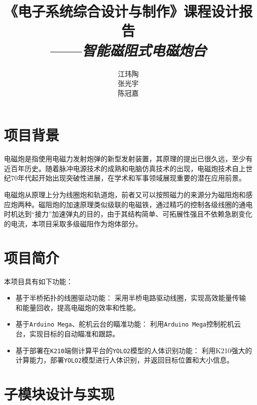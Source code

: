 \documentclass{article}
\title{《电子系统综合设计与制作》课程设计报告\\——\textit{智能磁阻式电磁炮台}}
\author{江玮陶\quad 2023010631\\张光宇\quad 2023010629\\陈冠嘉\quad 2023010503}
\begin{document}
\maketitle
\tableofcontents
\section{项目背景}
电磁炮是指使用电磁力发射炮弹的新型发射装置，其原理的提出已很久远，至少有近百年历史。随着脉冲电源技术的成熟和电脑仿真技术的出现，电磁炮技术自上世纪70年代起开始出现突破性进展，在学术和军事领域展现重要的潜在应用前景。

电磁炮从原理上分为线圈炮和轨道炮，前者又可以按照磁力的来源分为磁阻炮和感应炮两种。磁阻炮的加速原理类似级联的电磁铁，通过精巧的控制各级线圈的通电时机达到“接力”加速弹丸的目的，由于其结构简单、可拓展性强且不依赖急剧变化的电流，本项目采取多级磁阻作为炮体部分。
\section{项目简介}
本项目具有如下功能：
\begin{itemize}
    \item 基于半桥拓扑的线圈驱动功能： 采用半桥电路驱动线圈，实现高效能量传输和能量回收，提高电磁炮的效率和性能。
    \item 基于\texttt{Arduino Mega}、舵机云台的瞄准功能： 利用\texttt{Arduino Mega}控制舵机云台，实现目标的自动瞄准和跟踪。
    \item 基于部署在\texttt{K210}端侧计算平台的\texttt{YOLO2}模型的人体识别功能： 利用K210强大的计算能力，部署\texttt{YOLO2}模型进行人体识别，并返回目标位置和大小信息。
\end{itemize}
\section{子模块设计与实现}
\end{document}
